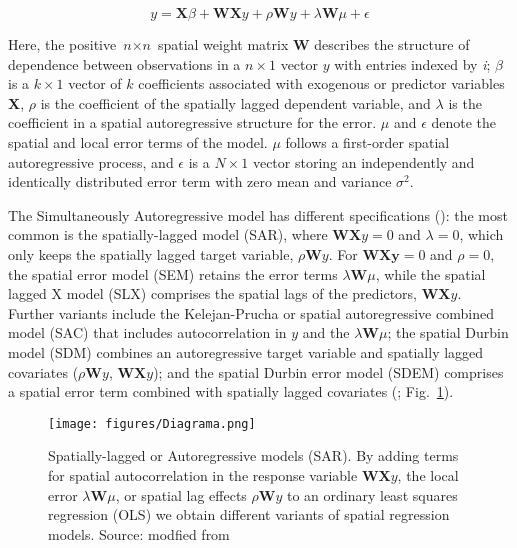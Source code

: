\documentclass[
  manuscript=article,  
  layout=preprint,  
  year=2023,
  volume=0,
]{format}
\begin{document}
$$
y = \textbf{X} \beta  + \textbf{W} \textbf{X} y + \rho \textbf{W} y + \lambda \textbf{W} \mu + \epsilon
$$

\par Here, the positive $\textit{n}\times\textit{n}$ spatial weight matrix \textbf{W} describes the structure of dependence between observations in a $n\times1$ vector $y$ with entries indexed by \textit{i}; $\beta$ is a $k\times1$ vector of $k$ coefficients associated with exogenous or predictor variables \textbf{X}, $\rho$ is the coefficient of the spatially lagged dependent variable, and $\lambda$ is the coefficient in a spatial autoregressive structure for the error. $\mu$ and $\epsilon$ denote the spatial and local error terms of the model. $\mu$ follows a first-order spatial autoregressive process, and $\epsilon$ is a $N\times1$ vector storing an independently and identically distributed error term with zero mean and variance $\sigma^2$.

\par The Simultaneously Autoregressive model has different specifications (\cite{elhorst2013spatial}): the most common is the spatially-lagged model (SAR), where $\textbf{W}\textbf{X}y=0$ and $\lambda=0$, which only keeps the spatially lagged target variable, $\rho \textbf{W}y$. For $\textbf{W}\textbf{Xy}=0$ and $\rho=0$, the spatial error model (SEM) retains the error terms $\lambda \textbf{W} \mu$, while the spatial lagged X model (SLX) comprises the spatial lags of the predictors, $\textbf{W} \textbf{X} y$. Further variants include the Kelejan-Prucha or spatial autoregressive combined model (SAC) that includes autocorrelation in $y$ and the $\lambda \textbf{W} \mu$; the spatial Durbin model (SDM) combines an autoregressive target variable and spatially lagged covariates ($\rho \textbf{W} y$, $\textbf{W} \textbf{X} y$); and the spatial Durbin error model (SDEM) comprises a spatial error term combined with spatially lagged covariates (\cite{elhorst2022dynamic, anselin2022spatial}; Fig.~\ref{fig:models}).

\begin{figure}[ht!]
    \centering
    {\texttt{[image: figures/Diagrama.png]}}
    \caption{Spatially-lagged or Autoregressive models (SAR). By adding terms for spatial autocorrelation in the response variable $\textbf{W} \textbf{X} y$, the local error $\lambda \textbf{W} \mu$, or spatial lag effects $\rho \textbf{W} y$ to an ordinary least squares regression (OLS) we obtain different variants of spatial regression models. Source: modfied from \cite{lesage2009introduction, kelejian2007relative, cliff1981spatial}}
    \label{fig:models}
\end{figure}
\end{document}
